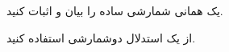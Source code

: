 \begin{question}
یک همانی شمارشی ساده را بیان و اثبات کنید.

\begin{solution}
از یک استدلال دوشمارشی استفاده کنید.
\end{solution}
\end{question}
